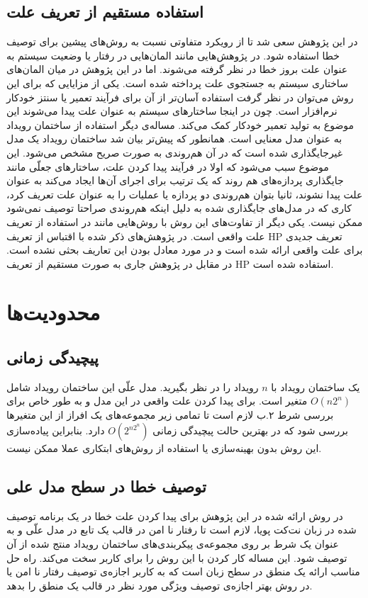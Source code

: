  \subsection{استفاده مستقیم از تعریف علت}
در این پژوهش سعی شد تا از رویکرد متفاوتی نسبت به روش‌های پیشین برای توصیف خطا استفاده شود.
در پژوهش‌هایی مانند
\cite{causality-checking,causal-hml,chockler}
المان‌هایی در رفتار یا وضعیت سیستم به عنوان علت بروز خطا در نظر گرفته می‌شوند.
اما در این پژوهش در میان المان‌های ساختاری سیستم به جستجوی علت پرداخته شده است.
یکی از مزایایی که برای این روش می‌توان در نظر گرفت استفاده آسان‌تر از آن برای فرآیند تعمیر یا سنتز خودکار نرم‌افزار است. 
چون در اینجا ساختار‌های سیستم به عنوان علت پیدا می‌شوند این موضوع به تولید تعمیر خودکار کمک می‌کند.
مساله‌ی دیگر استفاده از ساختمان رویداد به عنوان مدل معنایی است.
همانطور که پیش‌تر بیان شد ساختمان رویداد یک مدل غیرجایگذاری شده است که در آن هم‌روندی به صورت صریح مشخص می‌شود.
این موضوع سبب می‌شود که اولا در فرآیند پیدا کردن علت، ساختار‌های جعلّی مانند جایگذاری پردازه‌های هم روند که یک ترتیب برای اجرای آن‌ها ایجاد می‌کند به عنوان علت پیدا نشوند، ثانیا بتوان هم‌روندی دو پردازه یا عملیات را به عنوان علت تعریف کرد، کاری که در مدل‌های جایگذاری شده به دلیل اینکه هم‌روندی صراحتا توصیف نمی‌شود ممکن نیست.
یکی دیگر از تفاوت‌های این روش با روش‌هایی مانند
\cite{causal-hml,causality-checking}
در استفاده از تعریف علت واقعی است.
در پژوهش‌های ذکر شده با اقتباس از تعریف
HP
تعریف جدیدی برای علت واقعی ارائه شده است و در مورد معادل بودن این تعاریف بحثی نشده است.
در مقابل در پژوهش جاری به صورت مستقیم از تعریف 
HP
استفاده شده است.

\section{محدودیت‌ها}
\subsection{پیچیدگی زمانی}
یک ساختمان رویداد با 
$n$
رویداد را در نظر بگیرید.
مدل علّی این ساختمان رویداد شامل 
$O(n2^n)$
متغیر است.
برای پیدا کردن علت واقعی در این مدل و به طور خاص برای بررسی شرط ۲.ب لازم است تا تمامی زیر مجموعه‌های یک افراز از این متغیر‌ها بررسی شود که در بهترین حالت پیچیدگی زمانی
$O(2^{n2^n})$
دارد.
بنابراین پیاده‌سازی این روش بدون بهینه‌سازی یا استفاده از روش‌های ابتکاری عملا ممکن نیست.
\subsection{توصیف خطا در سطح مدل علی}
در روش ارائه شده در این پژوهش برای پیدا کردن علت خطا در یک برنامه توصیف شده در زبان نت‌کت پویا، لازم است تا رفتار نا امن در قالب یک تابع در مدل علّی و به عنوان یک شرط بر روی مجموعه‌ی پیکربندی‌های ساختمان رویداد منتج شده از‌ آن توصیف شود.
این مساله کار کردن با این روش را برای کاربر سخت می‌کند. 
راه حل مناسب ارائه یک منطق در سطح زبان است که به کاربر اجازه‌ی توصیف رفتار نا امن یا در روش بهتر اجازه‌ی توصیف ویژگی مورد نظر در قالب یک منطق را بدهد.

